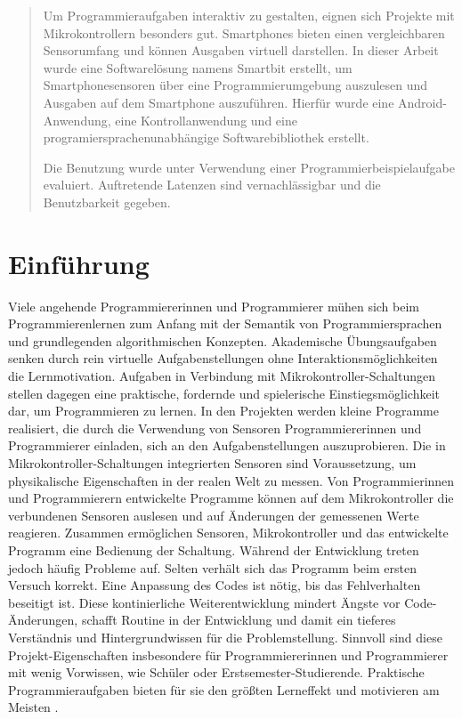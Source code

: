 \documentclass[11pt,a4paper]{report}
\begin{document}



\begin{abstract}
Um Programmieraufgaben interaktiv zu gestalten, eignen sich Projekte mit Mikrokontrollern besonders gut.
Smartphones bieten einen vergleichbaren Sensorumfang und können Ausgaben virtuell darstellen.
In dieser Arbeit wurde eine Softwarelösung namens Smartbit erstellt, um Smartphonesensoren über eine Programmierumgebung auszulesen und Ausgaben auf dem Smartphone auszuführen.
Hierfür wurde eine Android-Anwendung, eine Kontrollanwendung und eine programiersprachenunabhängige Softwarebibliothek erstellt.

Die Benutzung wurde unter Verwendung einer Programmierbeispielaufgabe evaluiert.
Auftretende Latenzen sind vernachlässigbar und die Benutzbarkeit gegeben.
\end{abstract}

\tableofcontents

\chapter{Einführung} \label{chap:intro}
Viele angehende Programmiererinnen und Programmierer mühen sich beim Programmierenlernen zum Anfang mit der Semantik von Programmiersprachen und grundlegenden algorithmischen Konzepten.
Akademische Übungsaufgaben senken durch rein virtuelle Aufgabenstellungen ohne Interaktionsmöglichkeiten die Lernmotivation.
Aufgaben in Verbindung mit Mikrokontroller-Schaltungen stellen dagegen eine praktische, fordernde und spielerische Einstiegsmöglichkeit dar, um Programmieren zu lernen.
In den Projekten werden kleine Programme realisiert, die durch die Verwendung von Sensoren Programmiererinnen und Programmierer einladen, sich an den Aufgabenstellungen auszuprobieren.
Die in Mikrokontroller-Schaltungen integrierten Sensoren sind Voraussetzung, um physikalische Eigenschaften in der realen Welt zu messen.
Von Programmierinnen und Programmierern entwickelte Programme können auf dem Mikrokontroller die verbundenen Sensoren auslesen und auf Änderungen der gemessenen Werte reagieren.
Zusammen ermöglichen Sensoren, Mikrokontroller und das entwickelte Programm eine Bedienung der Schaltung.
Während der Entwicklung treten jedoch häufig Probleme auf.
Selten verhält sich das Programm beim ersten Versuch korrekt.
Eine Anpassung des Codes ist nötig, bis das Fehlverhalten beseitigt ist.
Diese kontinierliche Weiterentwicklung mindert Ängste vor Code-Änderungen, schafft Routine in der Entwicklung und damit ein tieferes Verständnis und Hintergrundwissen für die Problemstellung.
Sinnvoll sind diese Projekt-Eigenschaften insbesondere für Programmiererinnen und Programmierer mit wenig Vorwissen, wie Schüler oder Erstsemester-Studierende.
Praktische Programmieraufgaben bieten für sie den größten Lerneffekt und motivieren am Meisten \cite{learning_computer_programming}.
\end{document}
